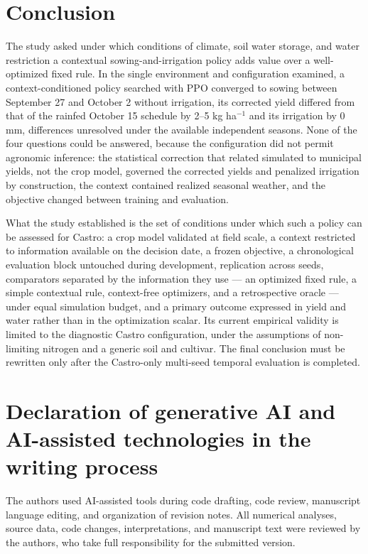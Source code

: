 \documentclass[times,final,authoryear]{elsarticle}
\begin{document}
\section{Conclusion}
\label{conclusao}

The study asked under which conditions of climate, soil water storage, and water restriction a contextual sowing-and-irrigation policy adds value over a well-optimized fixed rule. In the single environment and configuration examined, a context-conditioned policy searched with PPO converged to sowing between September 27 and October 2 without irrigation, its corrected yield differed from that of the rainfed October 15 schedule by 2--5 kg ha$^{-1}$ and its irrigation by 0 mm, differences unresolved under the available independent seasons. None of the four questions could be answered, because the configuration did not permit agronomic inference: the statistical correction that related simulated to municipal yields, not the crop model, governed the corrected yields and penalized irrigation by construction, the context contained realized seasonal weather, and the objective changed between training and evaluation.

What the study established is the set of conditions under which such a policy can be assessed for Castro: a crop model validated at field scale, a context restricted to information available on the decision date, a frozen objective, a chronological evaluation block untouched during development, replication across seeds, comparators separated by the information they use --- an optimized fixed rule, a simple contextual rule, context-free optimizers, and a retrospective oracle --- under equal simulation budget, and a primary outcome expressed in yield and water rather than in the optimization scalar. Its current empirical validity is limited to the diagnostic Castro configuration, under the assumptions of non-limiting nitrogen and a generic soil and cultivar. The final conclusion must be rewritten only after the Castro-only multi-seed temporal evaluation is completed.


\section*{Declaration of generative AI and AI-assisted technologies in the writing process}

The authors used AI-assisted tools during code drafting, code review, manuscript language editing, and organization of revision notes. All numerical analyses, source data, code changes, interpretations, and manuscript text were reviewed by the authors, who take full responsibility for the submitted version.
\end{document}
